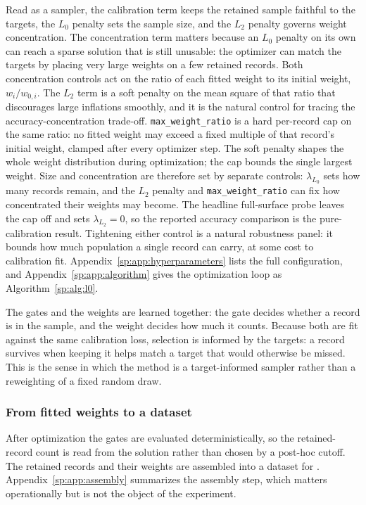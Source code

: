 Read as a sampler, the calibration term keeps the retained sample faithful to the targets, the $L_0$
penalty sets the sample size, and the $L_2$ penalty governs weight concentration. The concentration
term matters because an $L_0$ penalty on its own can reach a sparse solution that is still unusable: the
optimizer can match the targets by placing very large weights on a few retained records. Both
concentration controls act on the ratio of each fitted weight to its initial weight, $w_i / w_{0,i}$.
The $L_2$ term is a soft penalty on the mean square of that ratio that discourages large inflations
smoothly, and it is the natural control for tracing the accuracy-concentration trade-off.
\texttt{max\_weight\_ratio} is a hard per-record cap on the same ratio: no fitted weight may exceed a
fixed multiple of that record's initial weight, clamped after every optimizer step. The soft penalty
shapes the whole weight distribution during optimization; the cap bounds the single largest weight.
Size and concentration are therefore set by separate controls: $\lambda_{L_0}$ sets how many records
remain, and the $L_2$ penalty and \texttt{max\_weight\_ratio} can fix how concentrated their weights may
become. The headline full-surface probe leaves the cap off and sets $\lambda_{L_2}=0$, so the reported
accuracy comparison is the pure-calibration result. Tightening either control is a natural robustness panel:
it bounds how much population a single record can carry, at some cost to calibration fit. Appendix~\ref{sp:app:hyperparameters} lists the
full configuration, and Appendix~\ref{sp:app:algorithm} gives the optimization loop as
Algorithm~\ref{sp:alg:l0}.

The gates and the weights are learned together: the gate decides whether a record is in the sample,
and the weight decides how much it counts. Because both are fit against the same calibration loss,
selection is informed by the targets: a record survives when keeping it helps match a target that
would otherwise be missed. This is the sense in which the method is a target-informed sampler rather
than a reweighting of a fixed random draw.

\subsubsection{From fitted weights to a dataset}

After optimization the gates are evaluated deterministically, so the retained-record count is read
from the solution rather than chosen by a post-hoc cutoff. The retained records and their weights are
assembled into a dataset for \policyengine{}. Appendix~\ref{sp:app:assembly} summarizes the assembly
step, which matters operationally but is not the object of the experiment.

